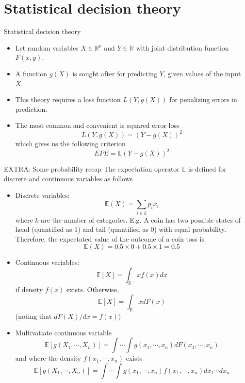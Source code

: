 \documentclass{beamer}
\newcommand{\E}{\mathbb{E}}
\newcommand{\R}{\mathbb{R}}
\begin{document}
\section{Statistical decision theory}
\begin{frame}{Statistical decision theory}
\begin{itemize}
\item{} Let random variables $X\in \mathbb{R}^p$ and $Y\in\mathbb{R}$ with joint distribution function $F(x,y)$.
\item{} A function $g(X)$ is sought after for predicting $Y$, given values of the input $X$.
\item{} This theory requires a loss function $L(Y,g(X))$ for penalizing errors in prediction.
\item{} The most common and convenient is squared error loss 
\begin{equation}
L(Y,g(X))=(Y-g(X))^2
\end{equation}
which gives us the following criterion
\begin{equation}\label{eq: EPE}
EPE=\mathbb{E}(Y-g(X))^2
\end{equation}
\end{itemize}
\end{frame}

\begin{frame}{EXTRA: Some probability recap}
The expectation operator $\mathbb{E}$ is defined for discrete and continuous variables as follows
\begin{itemize}
\item{} Discrete variables:
\[
\mathbb{E}(X)=\sum\limits_{i\in k}p_ix_i
\]
where $k$ are the number of categories.
E.g. A coin has two possible states of head (quantified as $1$) and tail (quantified as $0$) with equal probability. Therefore, the expectated value of the outcome of a coin toss is
\[
\E(X)=0.5\times 0 +0.5\times 1=0.5
\]
\end{itemize}
\end{frame}

\begin{frame}
\begin{itemize}
\item{} Continuous variables:
\[
\E[X]=\int_{\R}xf(x)dx
\]
if density $f(x)$ exists. Otherwise,
\[
\E[X]=\int_{\R}xdF(x)
\]
(noting that $dF(X)/dx=f(x))$
\item{} Multivatiate continuous variable
\[
\E[g(X_1,\cdots,X_n)]=\int\cdots\int g(x_1,\cdots,x_n)dF(x_1,\cdots,x_n)
\]
and where the density $f(x_1,\cdots,x_n)$ exists
\[
\E[g(X_1,\cdots,X_n)]=\int\cdots\int g(x_1,\cdots,x_n)f(x_1,\cdots,x_n)dx_1\cdots dx_n
\]
\end{itemize}
\end{frame}
\end{document}

